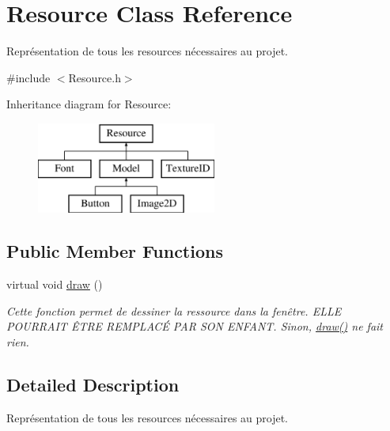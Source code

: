 \hypertarget{class_resource}{}\section{Resource Class Reference}
\label{class_resource}


Représentation de tous les resources nécessaires au projet.  




{\ttfamily \#include $<$Resource.\+h$>$}

Inheritance diagram for Resource\+:\begin{figure}[H]
\begin{center}
\leavevmode
\includegraphics[height=3.000000cm]{class_resource}
\end{center}
\end{figure}
\subsection*{Public Member Functions}
\begin{DoxyCompactItemize}
\item 
\hypertarget{class_resource_aefa4170232edb1efdf32b404789d0af8}{}virtual void \hyperlink{class_resource_aefa4170232edb1efdf32b404789d0af8}{draw} ()\label{class_resource_aefa4170232edb1efdf32b404789d0af8}

\begin{DoxyCompactList}\small\item\em Cette fonction permet de dessiner la ressource dans la fenêtre. E\+L\+L\+E P\+O\+U\+R\+R\+A\+I\+T Ê\+T\+R\+E R\+E\+M\+P\+L\+A\+CÉ P\+A\+R S\+O\+N E\+N\+F\+A\+N\+T. Sinon, \hyperlink{class_resource_aefa4170232edb1efdf32b404789d0af8}{draw()} ne fait rien. \end{DoxyCompactList}\end{DoxyCompactItemize}


\subsection{Detailed Description}
Représentation de tous les resources nécessaires au projet. 

